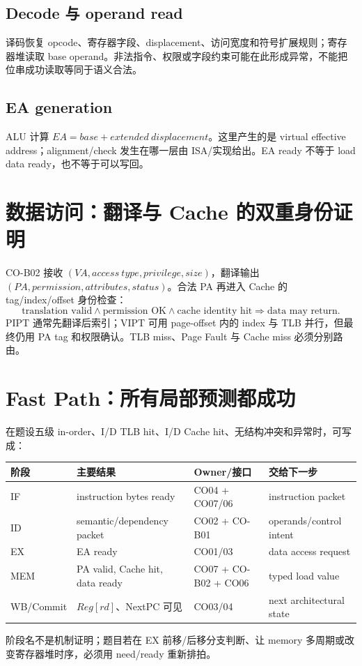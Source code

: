 \documentclass[UTF8,fontset=fandol,11pt,a4paper]{ctexart}
\begin{document}
\subsection{Decode 与 operand read}
译码恢复 opcode、寄存器字段、displacement、访问宽度和符号扩展规则；寄存器堆读取 base operand。非法指令、权限或字段约束可能在此形成异常，不能把位串成功读取等同于语义合法。

\subsection{EA generation}
ALU 计算 $EA=base+extended\ displacement$。这里产生的是 virtual effective address；alignment/check 发生在哪一层由 ISA/实现给出。EA ready 不等于 load data ready，也不等于可以写回。

\section{数据访问：翻译与 Cache 的双重身份证明}
CO-B02 接收 $(VA,access\ type,privilege,size)$，翻译输出 $(PA,permission,attributes,status)$。合法 PA 再进入 Cache 的 tag/index/offset 身份检查：
\[
\text{translation valid}\land\text{permission OK}\land\text{cache identity hit}
\Rightarrow\text{data may return}.
\]
PIPT 通常先翻译后索引；VIPT 可用 page-offset 内的 index 与 TLB 并行，但最终仍用 PA tag 和权限确认。TLB miss、Page Fault 与 Cache miss 必须分别路由。

\section{Fast Path：所有局部预测都成功}
在题设五级 in-order、I/D TLB hit、I/D Cache hit、无结构冲突和异常时，可写成：
\begin{center}\small
\begin{tabularx}{\linewidth}{L{1.4cm}L{2.3cm}YY}\toprule
阶段 & 主要结果 & Owner/接口 & 交给下一步\\\midrule
IF & instruction bytes ready & CO04 + CO07/06 & instruction packet\\
ID & semantic/dependency packet & CO02 + CO-B01 & operands/control intent\\
EX & EA ready & CO01/03 & data access request\\
MEM & PA valid, Cache hit, data ready & CO07 + CO-B02 + CO06 & typed load value\\
WB/Commit & $Reg[rd]$、NextPC 可见 & CO03/04 & next architectural state\\
\bottomrule
\end{tabularx}
\end{center}
阶段名不是机制证明；题目若在 EX 前移/后移分支判断、让 memory 多周期或改变寄存器堆时序，必须用 need/ready 重新排拍。
\end{document}
